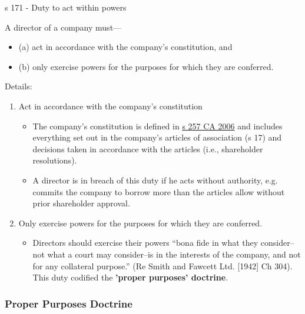 \documentclass[
]{article}
\providecommand{\tightlist}{%
  \setlength{\itemsep}{0pt}\setlength{\parskip}{0pt}}
\newenvironment{env-136e818f-6bd8-45c9-b7d8-e6b8925f9e62}
{
    \savenotes\tcolorbox[blanker,breakable,left=5pt,borderline west={2pt}{-4pt}{green}]
}
{
    \endtcolorbox\spewnotes
}
\begin{document}
\begin{env-136e818f-6bd8-45c9-b7d8-e6b8925f9e62}

s 171 - Duty to act within powers

A director of a company must---

\begin{itemize}
\tightlist
\item
  (a) act in accordance with the company's constitution, and
\item
  (b) only exercise powers for the purposes for which they are
  conferred.
\end{itemize}

\end{env-136e818f-6bd8-45c9-b7d8-e6b8925f9e62}

Details:

\begin{enumerate}
\tightlist
\item
  Act in accordance with the company's constitution

  \begin{itemize}
  \tightlist
  \item
    The company's constitution is defined in
    \href{https://www.legislation.gov.uk/ukpga/2006/46/section/257}{s
    257 CA 2006} and includes everything set out in the company's
    articles of association (s 17) and decisions taken in accordance
    with the articles (i.e., shareholder resolutions).
  \item
    A director is in breach of this duty if he acts without authority,
    e.g. commits the company to borrow more than the articles allow
    without prior shareholder approval.
  \end{itemize}
\item
  Only exercise powers for the purposes for which they are conferred.

  \begin{itemize}
  \tightlist
  \item
    Directors should exercise their powers ``bona fide in what they
    consider--not what a court may consider--is in the interests of the
    company, and not for any collateral purpose.'' (Re Smith and Fawcett
    Ltd. {[}1942{]} Ch 304). This duty codified the \textbf{'proper
    purposes' doctrine}.
  \end{itemize}
\end{enumerate}

\hypertarget{proper-purposes-doctrine}{%
\subsubsection{Proper Purposes
Doctrine}\label{proper-purposes-doctrine}}
\end{document}
